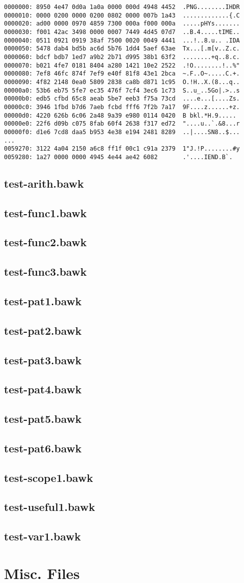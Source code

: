 \documentclass[letterpaper,11pt]{report}
\newcommand{\testfile}[1]{%
	\subsection{#1}
	
	}
\begin{document}
\begin{verbatim}
0000000: 8950 4e47 0d0a 1a0a 0000 000d 4948 4452  .PNG........IHDR
0000010: 0000 0200 0000 0200 0802 0000 007b 1a43  .............{.C
0000020: ad00 0000 0970 4859 7300 000a f000 000a  .....pHYs.......
0000030: f001 42ac 3498 0000 0007 7449 4d45 07d7  ..B.4.....tIME..
0000040: 0511 0921 0919 38af 7500 0020 0049 4441  ...!..8.u.. .IDA
0000050: 5478 dab4 bd5b ac6d 5b76 1dd4 5aef 63ae  Tx...[.m[v..Z.c.
0000060: bdcf bdb7 1ed7 a9b2 2b71 d995 38b1 63f2  ........+q..8.c.
0000070: b021 4fe7 0181 8404 a280 1421 10e2 2522  .!O........!..%"
0000080: 7ef8 46fc 874f 7ef9 e40f 81f8 43e1 2bca  ~.F..O~.....C.+.
0000090: 4f82 2148 0ea0 5809 2838 ca8b d871 1c95  O.!H..X.(8...q..
00000a0: 53b6 eb75 5fe7 ec35 476f 7cf4 3ec6 1c73  S..u_..5Go|.>..s
00000b0: edb5 cfbd 65c8 aeab 5be7 eeb3 f75a 73cd  ....e...[....Zs.
00000c0: 3946 1fbd b7d6 7aeb fcbd fff6 7f2b 7a17  9F....z......+z.
00000d0: 4220 626b 6c06 2a48 9a39 e980 0114 0420  B bkl.*H.9..... 
00000e0: 22f6 d09b c075 8fab 60f4 2638 f317 ed72  "....u..`.&8...r
00000f0: d1e6 7cd8 daa5 b953 4e38 e194 2481 8289  ..|....SN8..$...
...
0059270: 3122 4a04 2150 a6c8 ff1f 00c1 c91a 2379  1"J.!P........#y
0059280: 1a27 0000 0000 4945 4e44 ae42 6082       .'....IEND.B`.
\end{verbatim}

\testfile{test-arith.bawk}
\testfile{test-func1.bawk}
\testfile{test-func2.bawk}
\testfile{test-func3.bawk}
\testfile{test-pat1.bawk}
\testfile{test-pat2.bawk}
\testfile{test-pat3.bawk}
\testfile{test-pat4.bawk}
\testfile{test-pat5.bawk}
\testfile{test-pat6.bawk}
\testfile{test-scope1.bawk}
\testfile{test-useful1.bawk}
\testfile{test-var1.bawk}

\section{Misc. Files}


\end{document}
